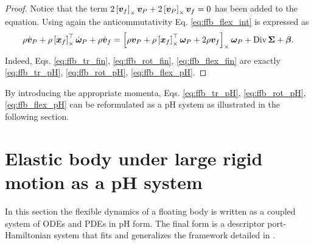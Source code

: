 \begin{proof}
Notice that the term $2 \left[\bm{v}_f\right]_\times\bm{v}_P + 2 \left[\bm{v}_P\right]_\times\bm{v}_f = 0$ has been added to the equation. Using again the anticommutativity Eq. \eqref{eq:ffb_flex_int} is expressed as 
\begin{equation}
\label{eq:ffb_flex_fin}
\rho \dot{\bm{v}}_P + \rho \left[\bm{x}_f\right]_\times^\top \dot{\bm\omega}_P  + \rho \dot{\bm{v}}_f = 
\left[\rho \bm{v}_P + \rho \left[\bm{x}_f\right]_\times^\top \bm\omega_P + 2 \rho \bm{v}_f\right]_\times \bm\omega_P + \operatorname*{Div}{\bm\Sigma} + \bm\beta.
\end{equation}
Indeed, Eqs. \eqref{eq:ffb_tr_fin}, \eqref{eq:ffb_rot_fin}, \eqref{eq:ffb_flex_fin} are exactly \eqref{eq:ffb_tr_pH}, \eqref{eq:ffb_rot_pH}, \eqref{eq:ffb_flex_pH}.
\end{proof}

By introducing the appropriate momenta, Eqs. \eqref{eq:ffb_tr_pH}, \eqref{eq:ffb_rot_pH}, \eqref{eq:ffb_flex_pH} can be reformulated as a pH system as illustrated in the following section.


\section{Elastic body under large rigid motion as a pH system}
\label{sec:pH_fd}
In this section the flexible dynamics of a floating body is written as a coupled system of ODEs and PDEs in pH form. The final form is a descriptor port-Hamiltonian system that fits and generalizes the framework detailed in \cite{beattie2018linear,mehrmann2019structurepreserving}.  


